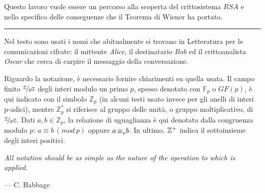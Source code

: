 \documentclass[twoside,symmetric,justified,openany,nobib]{tufte-book}
\newcommand{\A}{\textit{Alice}\xspace}
\newcommand{\B}{\textit{Bob}\xspace}
\newcommand{\OS}{\textit{Oscar}\xspace}
\begin{document}
Questo lavoro vuole essere un percorso alla scoperta del crittosistema $RSA$ e
nello specifico delle conseguenze che il Teorema di Wiener ha portato.

\newpage
\vspace*{0.7cm}
\tableofcontents
\vspace*{\fill}
\begin{fullwidth}
  \color{black!50}
  \hfill\rule{1\linewidth}{1pt}
  \footnotesize
  \color{black}
  Nel testo sono usati i nomi che abitualmente si trovano in Letteratura per le comunicazioni cifrate: il mittente \A, il destinatario \B ed il crittoanalista \OS che cerca di carpire il messaggio della conversazione.
  
  Riguardo la notazione, è necessario fornire chiarimenti su quella usata. Il campo finito $\nicefrac{\mathbb{Z}}{p\mathbb{Z}}$ degli interi modulo un primo $p$, spesso denotato con $\mathbb{F}_p$ o $GF(p)$, è qui indicato con il simbolo $\mathbb{Z}_p$ (in alcuni testi usato invece per gli anelli di interi p-adici), mentre $\mathbb{Z}^*_p$ si riferisce al gruppo delle unità, o gruppo moltiplicativo, di $\nicefrac{\mathbb{Z}}{p\mathbb{Z}}$. Dati $a,b{\in}\mathbb{Z}_p$, la relazione di uguaglianza è qui denotata dalla congruenza modulo $p$: $a{\equiv}b\, (mod\,p)$ oppure $a\,{\equiv}_{\text{\tiny $p$}}b$. In ultimo, $\mathbb{Z}\textsuperscript{+}$ indica il sottoinsieme degli interi positivi.
\end{fullwidth}
\begin{displayquote}
  \begin{fullwidth}
    \raggedleft\footnotesize
    \textit{All notation should be as simple as the nature of the operation to which is applied.}

    --- C. Babbage
  \end{fullwidth}
\end{displayquote}



% 

% 
\mainmatter
\end{document}
